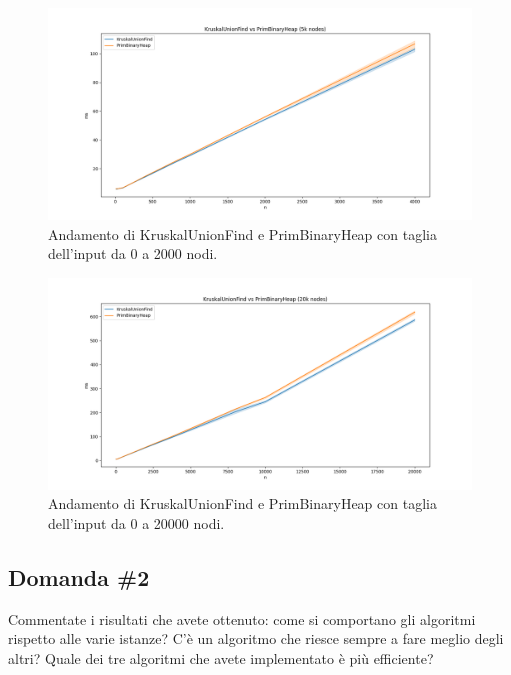 \begin{figure}[H]
    \centering
    \includegraphics[width=1.0\textwidth]{./images/KruskalUnionFind_vs_PrimBinaryHeap_(5k_nodes).png}
	\caption{Andamento di KruskalUnionFind e PrimBinaryHeap con taglia dell'input da 0 a 2000 nodi.}
    \label{fig:TheTwoComparison2k}
\end{figure}

\begin{figure}[H]
    \centering
    \includegraphics[width=1.0\textwidth]{./images/KruskalUnionFind_vs_PrimBinaryHeap_(20k_nodes).png}
    \caption{Andamento di KruskalUnionFind e PrimBinaryHeap con taglia dell'input da 0 a 20000 nodi.}
    \label{fig:TheTwoComparison5k}
\end{figure}

\subsection{Domanda \#2}

\begin{displayquote}
Commentate i risultati che avete ottenuto: come si comportano gli algoritmi rispetto alle varie istanze? C'è un algoritmo che riesce sempre a fare meglio degli altri? Quale dei tre algoritmi che avete implementato è più efficiente?
\end{displayquote}

